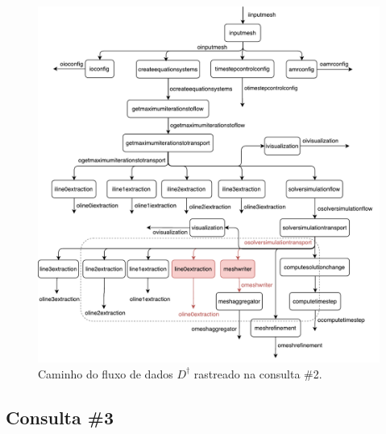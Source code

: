\begin{figure}[htb]
    \centering
    \includegraphics[width=\textwidth]{img/experiments-dataflow-2}
    \caption[Caminho do fluxo de dados \(D^{\dagger}\) rastreado na consulta \#2]{Caminho do fluxo de dados \(D^{\dagger}\) rastreado na consulta \#2.}%
    \label{fig:experiments-dataflow-2}
\end{figure}

\clearpage

\subsection{Consulta \#3}


